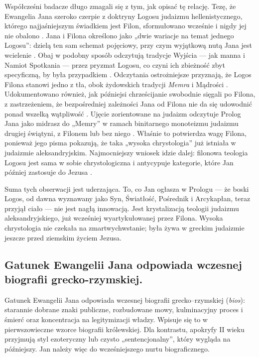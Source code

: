 Współcześni badacze długo zmagali się z tym, jak opisać tę relację.
Tezę, że Ewangelia Jana szeroko czerpie z doktryny Logosu judaizmu hellenistycznego, którego najjaśniejszym świadkiem jest Filon, sformułowano wcześnie i nigdy jej nie obalono \cite{dodd:fourthgospel}.
Jana i Filona określono jako „dwie wariacje na temat jednego Logosu”: dzielą ten sam schemat pojęciowy, przy czym wyjątkową nutą Jana jest wcielenie \cite{attridge:essays}.
Obaj w podobny sposób odczytują tradycje Wyjścia --- jak manna i Namiot Spotkania --- przez pryzmat Logosu, co czyni ich zbieżność zbyt specyficzną, by była przypadkiem \cite{borgen:philo}.
Odczytania ostrożniejsze przyznają, że Logos Filona stanowi jedno z tła, obok żydowskich tradycji \emph{Memra} i Mądrości \cite{brown:johannine}.
Udokumentowano również, jak późniejsi chrześcijanie swobodnie sięgali po Filona, z zastrzeżeniem, że bezpośredniej zależności Jana od Filona nie da się udowodnić ponad wszelką wątpliwość \cite{runia:philo}.
Ujęcie zorientowane na judaizm odczytuje Prolog Jana jako midrasz do „Memry” w ramach binitarnego monoteizmu judaizmu drugiej świątyni, z Filonem lub bez niego \cite{boyarin:jewishgospels}.
Właśnie to potwierdza wagę Filona, ponieważ jego pisma pokazują, że taka „wysoka chrystologia” już istniała w judaizmie aleksandryjskim.
Najmocniejszy wniosek idzie dalej: filonowa teologia Logosu jest sama w sobie chrystologiczna i antycypuje kategorie, które Jan później zastosuje do Jezusa \cite{hillar:logos}.

Suma tych obserwacji jest uderzająca.
To, co Jan ogłasza w Prologu --- że boski Logos, od dawna wyznawany jako Syn, Światłość, Pośrednik i Arcykapłan, teraz przyjął ciało --- nie jest nagłą innowacją.
Jest krystalizacją teologii judaizmu aleksandryjskiego, już wcześniej wyartykułowanej przez Filona.
Wysoka chrystologia nie czekała na zmartwychwstanie; była żywa w greckim judaizmie jeszcze przed ziemskim życiem Jezusa.

\subsection{Gatunek Ewangelii Jana odpowiada wczesnej biografii grecko-rzymskiej.}\label{subsec:johns-genre-fits-early-greco-roman-biography.}

Gatunek Ewangelii Jana odpowiada wczesnej biografii grecko–rzymskiej (\emph{bios}): starannie dobrane znaki publiczne, rozbudowane mowy, kulminacyjny proces i śmierć oraz koncentracja na legitymizacji władzy.
Wpisuje się to w pierwszowieczne wzorce biografii królewskiej.
Dla kontrastu, apokryfy II wieku przyjmują styl ezoteryczny lub czysto „sentencjonalny”, który wygląda na późniejszy.
Jan należy więc do wcześniejszego nurtu biograficznego.

